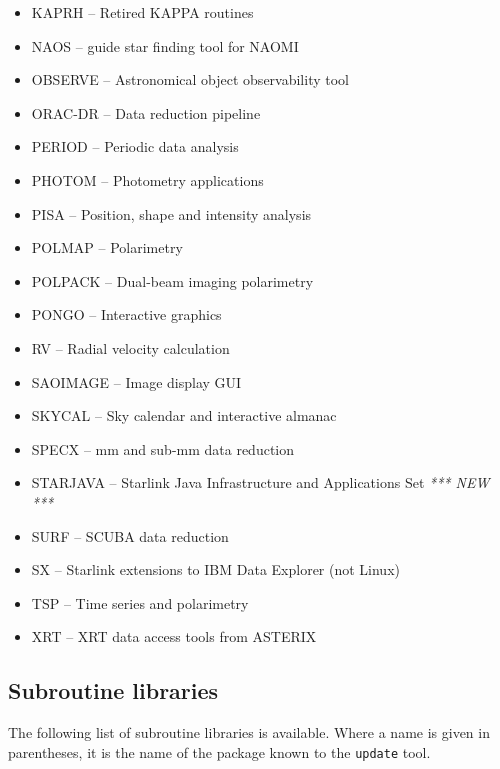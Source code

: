 \documentclass[twoside,11pt]{article}
\newcommand{\xlabel}[1]{}
\renewcommand{\_}{\texttt{\symbol{95}}}
\begin{document}
\begin{itemize}
\item KAPRH -- Retired KAPPA routines
\item NAOS -- guide star finding tool for NAOMI
\item OBSERVE -- Astronomical object observability tool
\item ORAC-DR -- Data reduction pipeline
\item PERIOD -- Periodic data analysis 
\item PHOTOM -- Photometry applications
\item PISA -- Position, shape and intensity analysis
\item POLMAP -- Polarimetry
\item POLPACK -- Dual-beam imaging polarimetry
\item PONGO -- Interactive graphics 
\item RV -- Radial velocity calculation
\item SAOIMAGE -- Image display GUI
\item SKYCAL -- Sky calendar and interactive almanac
\item SPECX -- mm and sub-mm data reduction
\item STARJAVA -- Starlink Java Infrastructure and Applications Set \hfill \emph{*** NEW ***}
\item SURF -- SCUBA data reduction
\item SX -- Starlink extensions to IBM Data Explorer (not Linux)
\item TSP -- Time series and polarimetry
\item XRT -- XRT data access tools from ASTERIX
\end{itemize}

\subsection{\xlabel{subroutine_libraries}Subroutine libraries}
\label{subroutine_libraries}

The following list of subroutine libraries is available.  Where a name
is given in parentheses, it is the name of the package known to the
\texttt{update} tool.
\end{document}
